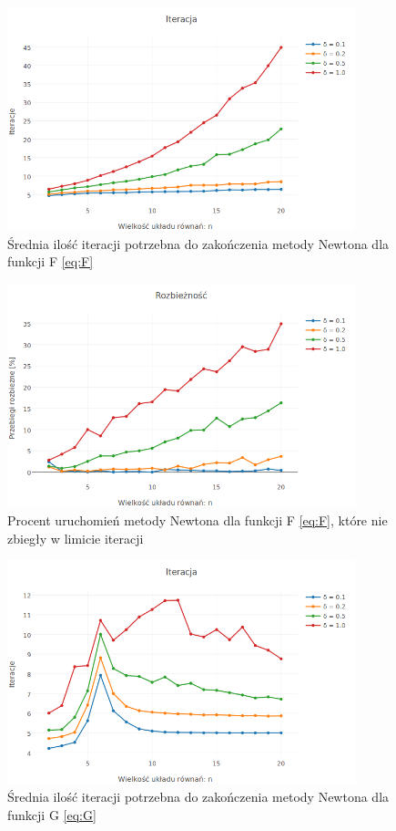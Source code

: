 \documentclass[11pt,wide]{mwart}
\begin{document}
\begin{figure}[h]
    \centering
    \includegraphics[width=0.9\textwidth]{avg_iterations_F}
    \caption{Średnia ilość iteracji potrzebna do zakończenia metody Newtona dla funkcji F \eqref{eq:F}}
    \label{fig:avgiterationsF}
\end{figure}

\begin{figure}[h]
    \centering
    \includegraphics[width=0.9\textwidth]{avg_diversions_F}
    \caption{Procent uruchomień metody Newtona dla funkcji F \eqref{eq:F}, które nie zbiegły w limicie iteracji}
    \label{fig:avgdiversionsF}
\end{figure}

\begin{figure}[h]
    \centering
    \includegraphics[width=0.9\textwidth]{avg_iterations_G}
    \caption{Średnia ilość iteracji potrzebna do zakończenia metody Newtona dla funkcji G \eqref{eq:G}}
    \label{fig:avgiterationsG}
\end{figure}
\end{document}
